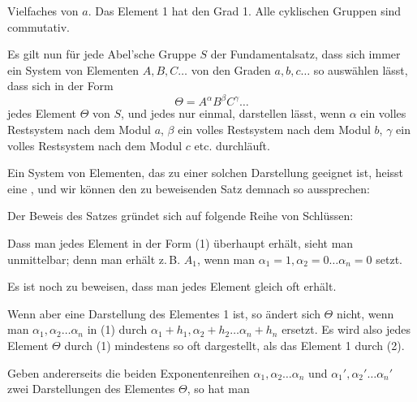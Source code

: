 Vielfaches von $a$. Das Element 1 hat den Grad 1. Alle cyklischen Gruppen sind commutativ.

Es gilt nun für jede Abel'sche Gruppe $S$ der Fundamentalsatz, dass sich immer ein System von Elementen $A, B, C \ldots$ von den Graden $a, b, c \ldots$ so auswählen lässt, dass sich in der Form
\[
\Theta = A^\alpha B^\beta C^\gamma \ldots
\]
jedes Element $\Theta$ von $S$, und jedes nur einmal, darstellen lässt, wenn $\alpha$ ein volles Restsystem nach dem Modul $a$, $\beta$ ein volles Restsystem nach dem Modul $b$, $\gamma$ ein volles Restsystem nach dem Modul $c$ etc. durchläuft.

Ein System von Elementen, das zu einer solchen Darstellung geeignet ist, heisst eine , und wir können den zu beweisenden Satz demnach so aussprechen:


Der Beweis des Satzes gründet sich auf folgende Reihe von Schlüssen:


Dass man jedes Element in der Form (1) überhaupt erhält, sieht man unmittelbar; denn man erhält z.\,B. $A_1$, wenn man $\alpha_1 = 1, \alpha_2 = 0 \ldots \alpha_n = 0$ setzt.

Es ist noch zu beweisen, dass man jedes Element gleich oft erhält.

Wenn aber
eine Darstellung des Elementes 1 ist, so ändert sich $\Theta$ nicht, wenn man $\alpha_1, \alpha_2 \ldots \alpha_n$ in (1) durch $\alpha_1 + h_1, \alpha_2 + h_2 \ldots \alpha_n + h_n$ ersetzt. Es wird also jedes Element $\Theta$ durch (1) mindestens so oft dargestellt, als das Element 1 durch (2).

Geben andererseits die beiden Exponentenreihen $\alpha_1, \alpha_2 \ldots \alpha_n$ und $\alpha_1', \alpha_2' \ldots \alpha_n'$ zwei Darstellungen des Elementes $\Theta$, so hat man
